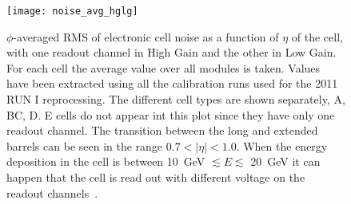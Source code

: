 \begin{figure}[!h]
  \centering
    \texttt{[image: noise\_avg\_hglg]}
    \caption{$\phi$-averaged RMS of electronic cell noise as a function of
      $\eta$ of the cell, with one readout channel in High Gain and the other in
      Low Gain. For each cell the average value over all modules is
      taken. Values have been extracted using all the calibration runs used for
      the 2011 RUN I reprocessing. The different cell types are shown
      separately, A, BC, D. E cells do not appear int this plot since they have
      only one readout channel. The transition between the long and extended
      barrels can be seen in the range $0.7 < |\eta| < 1.0$. When the energy
      deposition in the cell is between 10~GeV $\lesssim E \lesssim$ 20~GeV it
      can happen that the cell is read out with different voltage on the readout
      channels~\cite{MyTileCalPlots}.}
    \label{fig:noise_avg_hglg}
\end{figure}
